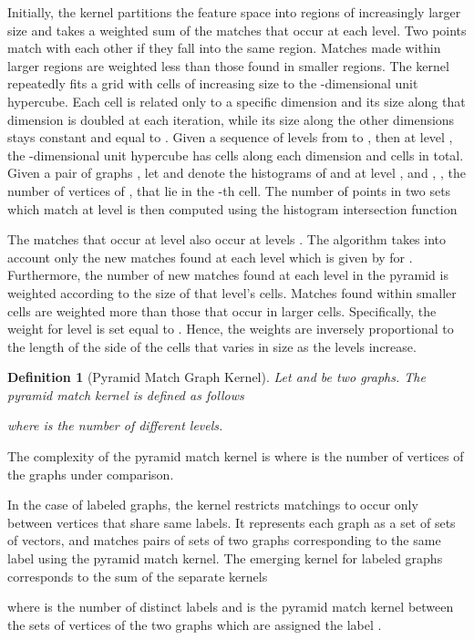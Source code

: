 \documentclass[twoside,11pt]{article}
\newtheorem{definition}{Definition}
\begin{document}
Initially, the kernel partitions the feature space into regions of increasingly larger size and takes a weighted sum of the matches that occur at each level.
Two points match with each other if they fall into the same region.
Matches made within larger regions are weighted less than those found in smaller regions.
The kernel repeatedly fits a grid with cells of increasing size to the -dimensional unit hypercube.
Each cell is related only to a specific dimension and its size along that dimension is doubled at each iteration, while its size along the other dimensions stays constant and equal to .
Given a sequence of levels from  to , then at level , the -dimensional unit hypercube has  cells along each dimension and  cells in total.
Given a pair of graphs , let  and  denote the histograms of  and  at level , and , , the number of vertices of ,  that lie in the -th cell.
The number of points in two sets which match at level  is then computed using the histogram intersection function

The matches that occur at level  also occur at levels .
The algorithm takes into account only the new matches found at each level which is given by  for .
Furthermore, the number of new matches found at each level in the pyramid is weighted according to the size of that level's cells.
Matches found within smaller cells are weighted more than those that occur in larger cells.
Specifically, the weight for level  is set equal to .
Hence, the weights are inversely proportional to the length of the side of the cells that varies in size as the levels increase.

\begin{definition}[Pyramid Match Graph Kernel]
  Let  and  be two graphs.
	The pyramid match kernel is defined as follows
	
	where  is the number of different levels.
\end{definition}
The complexity of the pyramid match kernel is  where  is the number of vertices of the graphs under comparison.

In the case of labeled graphs, the kernel restricts matchings to occur only between vertices that share same labels.
It represents each graph as a set of sets of vectors, and matches pairs of sets of two graphs corresponding to the same label using the pyramid match kernel.
The emerging kernel for labeled graphs corresponds to the sum of the separate kernels

where  is the number of distinct labels and  is the pyramid match kernel between the sets of vertices of the two graphs which are assigned the label .
\end{document}
